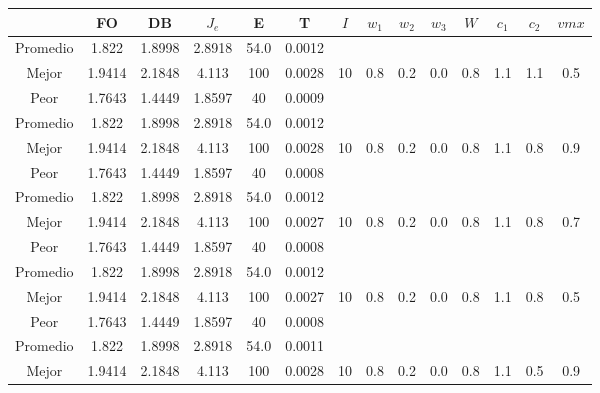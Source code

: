 \begin{table}[h!]
    \footnotesize
    \begin{center}
        \begin{tabular}{|c|c|c|c|c|c|c|c|c|c|c|c|c|c|}
        \hline
            & {\bf FO} & {\bf DB} & $J_e$ & {\bf E} & {\bf T} & $I$ & $w_1$ & $w_2$ & $w_3$ & $W$ & $c_1$ & $c_2$ & $vmx$ \\
        \hline
        \hline
            Promedio  & 1.822 & 1.8998 & 2.8918 & 54.0 & 0.0012 &  &  &  &  &  &  &  & \\
            \cline{1-6}
            Mejor & 1.9414 & 2.1848  & 4.113 & 100 & 0.0028 & 10 & 0.8 & 0.2 & 0.0 & 0.8 & 1.1 & 1.1 & 0.5\\
            \cline{1-6}
            Peor & 1.7643 & 1.4449  & 1.8597 & 40 & 0.0009 &  &  &  &  &  &  &  & \\
        \hline
        \hline
            Promedio  & 1.822 & 1.8998 & 2.8918 & 54.0 & 0.0012 &  &  &  &  &  &  &  & \\
            \cline{1-6}
            Mejor & 1.9414 & 2.1848  & 4.113 & 100 & 0.0028 & 10 & 0.8 & 0.2 & 0.0 & 0.8 & 1.1 & 0.8 & 0.9\\
            \cline{1-6}
            Peor & 1.7643 & 1.4449  & 1.8597 & 40 & 0.0008 &  &  &  &  &  &  &  & \\
        \hline
        \hline
            Promedio  & 1.822 & 1.8998 & 2.8918 & 54.0 & 0.0012 &  &  &  &  &  &  &  & \\
            \cline{1-6}
            Mejor & 1.9414 & 2.1848  & 4.113 & 100 & 0.0027 & 10 & 0.8 & 0.2 & 0.0 & 0.8 & 1.1 & 0.8 & 0.7\\
            \cline{1-6}
            Peor & 1.7643 & 1.4449  & 1.8597 & 40 & 0.0008 &  &  &  &  &  &  &  & \\
        \hline
        \hline
            Promedio  & 1.822 & 1.8998 & 2.8918 & 54.0 & 0.0012 &  &  &  &  &  &  &  & \\
            \cline{1-6}
            Mejor & 1.9414 & 2.1848  & 4.113 & 100 & 0.0027 & 10 & 0.8 & 0.2 & 0.0 & 0.8 & 1.1 & 0.8 & 0.5\\
            \cline{1-6}
            Peor & 1.7643 & 1.4449  & 1.8597 & 40 & 0.0008 &  &  &  &  &  &  &  & \\
        \hline
        \hline
            Promedio  & 1.822 & 1.8998 & 2.8918 & 54.0 & 0.0011 &  &  &  &  &  &  &  & \\
            \cline{1-6}
            Mejor & 1.9414 & 2.1848  & 4.113 & 100 & 0.0028 & 10 & 0.8 & 0.2 & 0.0 & 0.8 & 1.1 & 0.5 & 0.9\\

\end{tabular}
\end{center}
\end{table}
